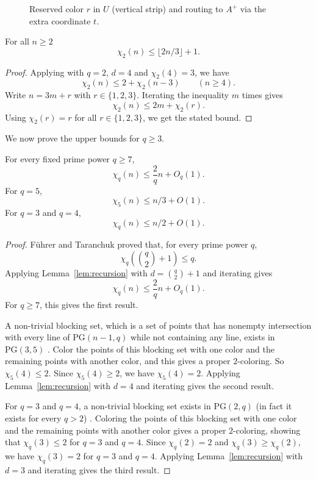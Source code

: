 \documentclass[11pt]{article}
\theoremstyle{plain}
\newcommand{\PG}{\mathrm{PG}}
\newenvironment{reptheorem}[1]{%
  \renewcommand\theinnerthm{\ref*{#1}}%
  \innerthm
}{\endinnerthm}
\begin{document}
\begin{figure}[!t]
  \caption{Reserved color $r$ in $U$ (vertical strip) and routing to $A^+$ via the extra coordinate $t$.}
  \label{fig:fig2}
\end{figure}

\begin{reptheorem}{thm:main}
For all $n \geq 2$
\[
  \chi_2(n)\le \lfloor 2n/3 \rfloor + 1 .
\]
\end{reptheorem}

\begin{proof}
Applying  with $q=2$, $d=4$ and $\chi_2(4)=3$, we have
\[
\chi_2(n)\le 2+\chi_2(n-3) \qquad (n\ge 4).
\]
Write $n=3m+r$ with $r\in\{1,2,3\}$.
Iterating the inequality $m$ times gives
\[
\chi_2(n)\le 2m + \chi_2(r).
\]
Using $\chi_2(r) = r$ for all $r \in \{1, 2, 3\}$, we get the stated bound.
\end{proof}

We now prove the upper bounds for $q\ge 3$.

\begin{reptheorem}{thm:chiq-upper-bound}
For every fixed prime power $q\ge 7$, 
\[
\chi_q(n)\le \frac{2}{q}n+O_q(1).
\]
For $q=5$, 
\[
\chi_5(n)\le n/3+O(1).
\]
For $q=3$ and $q=4$, 
\[
\chi_q(n)\le n/2+O(1).
\]
\end{reptheorem}

\begin{proof}
F\"uhrer and Taranchuk \cite{FuhrerTaranchuk2024} proved that, for every prime power $q$,
\[
\chi_q\!\left(\binom{q}{2}+1\right)\le q.
\]
Applying Lemma~\ref{lem:recursion} with $d=\binom{q}{2}+1$ and iterating gives
\[
\chi_q(n)\le \frac{2}{q}n+O_q(1).
\]
For $q\ge 7$, this gives the first result.

A non-trivial blocking set, which is a set of points that has nonempty intersection with every line of $\PG(n-1,q)$ while not containing any line, exists in $\PG(3,5)$ \cite{Rajola1988}.
Color the points of this blocking set with one color and the remaining points with another color, and this gives a proper $2$-coloring.
So $\chi_5(4)\le 2$. Since $\chi_5(4)\ge 2$, we have $\chi_5(4)=2$.
Applying Lemma~\ref{lem:recursion} with $d=4$ and iterating gives the second result.

For $q=3$ and $q=4$, a non-trivial blocking set exists in $\PG(2,q)$ (in fact it exists for every $q>2$) \cite{Richardson1956}. 
Coloring the points of this blocking set with one color and the remaining points with another color gives a proper $2$-coloring, showing that $\chi_q(3)\le 2$ for $q=3$ and $q=4$.
Since $\chi_q(2)=2$ and $\chi_q(3)\ge \chi_q(2)$, we have $\chi_q(3)=2$ for $q=3$ and $q=4$.
Applying Lemma~\ref{lem:recursion} with $d=3$ and iterating gives the third result.
\end{proof}
\end{document}
